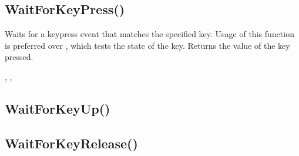 \documentclass[letterpaper,10pt,english]{sphinxmanual}
\begin{document}
\ignorespaces 

\subsection{WaitForKeyPress()}
\label{\detokenize{reference/peblenvironment:waitforkeypress}}\label{\detokenize{reference/peblenvironment:index-76}}
\sphinxAtStartPar
{}

\sphinxAtStartPar
Waits for a keypress event that matches the   specified key.  Usage of this function is preferred over   , which tests the state of the key. Returns the   value of the key pressed.

\sphinxAtStartPar
{}

\begin{sphinxVerbatim}[commandchars=\\\{\}]
\end{sphinxVerbatim}

\sphinxAtStartPar
{}

\sphinxAtStartPar
{}, , 

\ignorespaces 

\subsection{WaitForKeyUp()}
\label{\detokenize{reference/peblenvironment:waitforkeyup}}\label{\detokenize{reference/peblenvironment:index-77}}
\sphinxAtStartPar
{}

\ignorespaces 

\subsection{WaitForKeyRelease()}
\label{\detokenize{reference/peblenvironment:waitforkeyrelease}}\label{\detokenize{reference/peblenvironment:index-78}}
\sphinxAtStartPar
{}

\sphinxAtStartPar
{}
\end{document}
